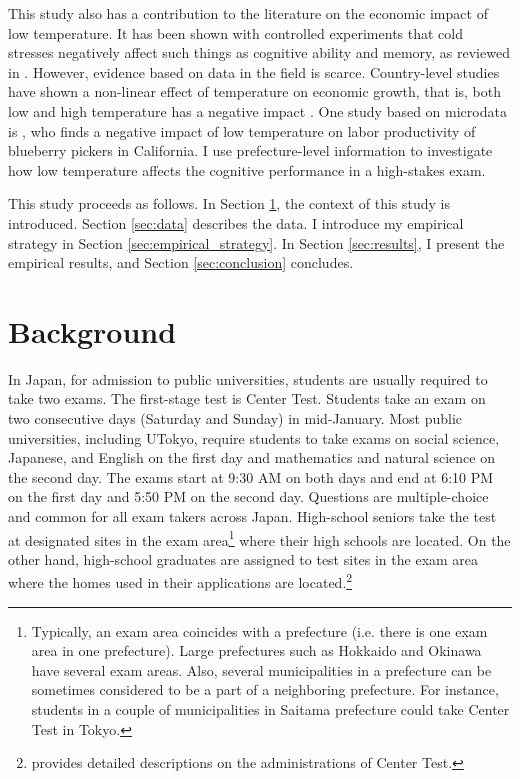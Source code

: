 \documentclass[12pt,letterpaper]{article}
\begin{document}
This study also has a contribution to the literature on the economic impact of low temperature.
It has been shown with controlled experiments that cold stresses negatively affect such things as cognitive ability and memory, as reviewed in \citet{Taylor2016}.
However, evidence based on data in the field is scarce.
Country-level studies have shown a non-linear effect of temperature on economic growth, that is, both low and high temperature has a negative impact \citep{Burke2015}.
One study based on microdata is \citet{Stevens2017}, who finds a negative impact of low temperature on labor productivity of blueberry pickers in California.
I use prefecture-level information to investigate how low temperature affects the cognitive performance in a high-stakes exam.

This study proceeds as follows.
In Section \ref{sec:background}, the context of this study is introduced.
Section \ref{sec:data} describes the data. 
I introduce my empirical strategy in Section \ref{sec:empirical_strategy}.
In Section \ref{sec:results}, I present the empirical results, and Section \ref{sec:conclusion} concludes.
  
\section{Background}\label{sec:background}

In Japan, for admission to public universities, students are usually required to take two exams.
The first-stage test is Center Test.
Students take an exam on two consecutive days (Saturday and Sunday) in mid-January.
Most public universities, including UTokyo, require students to take exams on social science, Japanese, and English on the first day and mathematics and natural science on the second day.
The exams start at 9:30 AM on both days and end at 6:10 PM on the first day and 5:50 PM on the second day.
Questions are multiple-choice and common for all exam takers across Japan.
High-school seniors take the test at designated sites in the exam area\footnote{ \label{footnote:prefecture}
  Typically, an exam area coincides with a prefecture (i.e. there is one exam area in one prefecture).
  Large prefectures such as Hokkaido and Okinawa have several exam areas.
  Also, several municipalities in a prefecture can be sometimes considered to be a part of a neighboring prefecture.
  For instance, students in a couple of municipalities in Saitama prefecture could take Center Test in Tokyo.
} where their high schools are located.
On the other hand, high-school graduates are assigned to test sites in the exam area where the homes used in their applications are located.\footnote{
  \citet{Watanabe2013} provides detailed descriptions on the administrations of Center Test.
}
\end{document}
